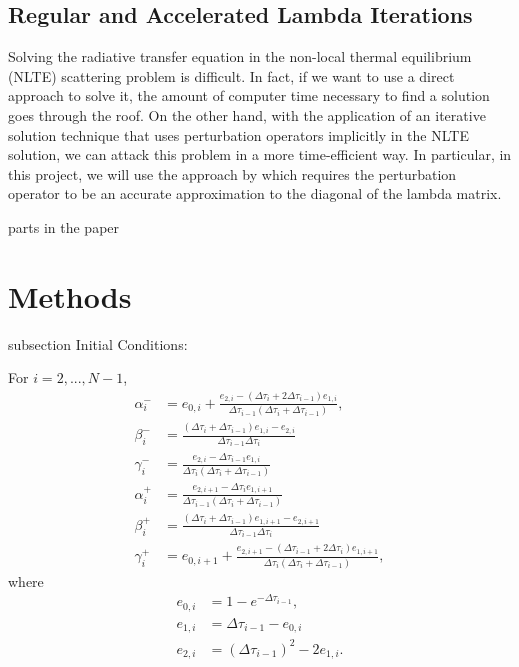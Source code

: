 \documentclass[12pt]{article}
\begin{document}
\subsection{Regular and Accelerated Lambda Iterations}



Solving the radiative transfer equation in the non-local thermal equilibrium (NLTE) scattering problem is difficult. In fact, if we want to use a direct approach to solve it, the amount of computer time necessary to find a solution goes through the roof. On the other hand, with the application of an iterative solution technique that uses perturbation operators implicitly in the NLTE solution, we can attack this problem in a more time-efficient way. In particular, in this project, we will use the approach by \citep{OandK1987} which requires the perturbation operator to be an accurate approximation to the diagonal of the lambda matrix.




parts in the paper

\section{Methods}

subsection
Initial Conditions:

For $i = 2, ..., N - 1$,
\begin{align*}
\alpha_i^-
&=
e_{0, i} +
\frac{e_{2, i} - (\Delta\tau_i + 2\Delta\tau_{i - 1}) e_{1, i}}
     {\Delta\tau_{i - 1} (\Delta\tau_i + \Delta\tau_{i - 1})},
\\ \beta_i^-
&=
\frac{(\Delta\tau_i + \Delta\tau_{i - 1}) e_{1, i} - e_{2, i}}
     {\Delta\tau_{i - 1} \Delta\tau_i}
\\ \gamma_i^-
&=
\frac{e_{2, i} - \Delta\tau_{i - 1} e_{1, i}}
     {\Delta\tau_i (\Delta\tau_i + \Delta\tau_{i - 1})}
\\ \alpha_i^+
&=
\frac{e_{2, i + 1} - \Delta\tau_i e_{1, i + 1}}
     {\Delta\tau_{i - 1} (\Delta\tau_i + \Delta\tau_{i - 1})}
\\ \beta_i^+
&=
\frac{(\Delta\tau_i + \Delta\tau_{i - 1}) e_{1, i + 1} - e_{2, i + 1}}
     {\Delta\tau_{i - 1} \Delta\tau_i}
\\ \gamma_i^+
&=
e_{0, i + 1} +
\frac{e_{2, i + 1} - (\Delta\tau_{i - 1} + 2\Delta\tau_i) e_{1, i + 1}}
     {\Delta\tau_i (\Delta\tau_i + \Delta\tau_{i - 1})},
\end{align*}
where
\begin{align*}
e_{0, i}
&=
1 - e^{-\Delta\tau_{i - 1}},
\\ e_{1, i}
&=
\Delta\tau_{i - 1} - e_{0, i}
\\ e_{2, i}
&=
(\Delta\tau_{i - 1})^2 - 2 e_{1, i}.
\end{align*}
\end{document}
